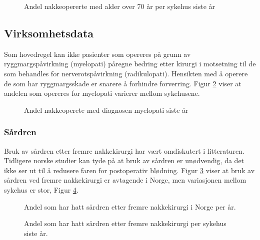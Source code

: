 \documentclass [norsk,a4paper,twoside]{article}\usepackage[]{graphicx}\usepackage[]{color}
\begin{document}
\begin{figure}[ht]
\caption{\label{fig:NakkeAlder70Sh} Andel nakkeopererte med alder over 70 år per sykehus siste år}
\end{figure}

\clearpage

\subsection{Virksomhetsdata}

Som hovedregel kan ikke pasienter som opereres på grunn av ryggmargspåvirkning (myelopati) påregne bedring etter kirurgi i motsetning til de som behandles for nerverotspåvirkning (radikulopati). Hensikten med å operere de som har ryggmargsskade er snarere å forhindre forverring. Figur \ref{fig:NakkeOprIndikMyelopatiSh} viser at andelen som opereres for myelopati varierer mellom sykehusene.

\begin{figure}[ht]
\caption{\label{fig:NakkeOprIndikMyelopatiSh} Andel nakkeoperete med diagnosen myelopati siste år}
\end{figure}




\clearpage

\subsubsection{Sårdren}

Bruk av sårdren etter fremre nakkekirurgi har vært omdiskutert i litteraturen. Tidligere norske studier kan tyde på at bruk av sårdren er unødvendig, da det ikke ser ut til å redusere faren for postoperativ blødning. Figur \ref{fig:NakkeSaardrenUmFTid} viser at bruk av sårdren ved fremre nakkekirurgi er avtagende i Norge, men variasjonen mellom sykehus er stor, Figur \ref{fig:NakkeSaardrenUmFSh}.

\begin{figure}[ht]
\caption{\label{fig:NakkeSaardrenUmFTid} Andel som har hatt sårdren etter fremre nakkekirurgi i Norge per år.}
\end{figure}

\begin{figure}[ht]
\caption{\label{fig:NakkeSaardrenUmFSh} Andel som har hatt sårdren etter fremre nakkekirurgi per sykehus siste år.}
\end{figure}
\end{document}
